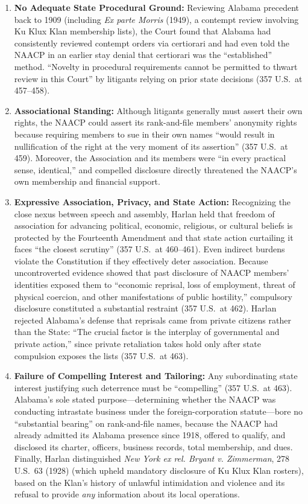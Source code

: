 \documentclass[12pt]{article}
\begin{document}
\begin{enumerate}
  \item \textbf{No Adequate State Procedural Ground:} Reviewing Alabama precedent back to 1909 (including \textit{Ex parte Morris} (1949), a contempt review involving Ku Klux Klan membership lists), the Court found that Alabama had consistently reviewed contempt orders via certiorari and had even told the NAACP in an earlier stay denial that certiorari was the ``established'' method. ``Novelty in procedural requirements cannot be permitted to thwart review in this Court'' by litigants relying on prior state decisions (357 U.S.\ at 457--458).

  \item \textbf{Associational Standing:} Although litigants generally must assert their own rights, the NAACP could assert its rank-and-file members' anonymity rights because requiring members to sue in their own names ``would result in nullification of the right at the very moment of its assertion'' (357 U.S.\ at 459). Moreover, the Association and its members were ``in every practical sense, identical,'' and compelled disclosure directly threatened the NAACP's own membership and financial support.

  \item \textbf{Expressive Association, Privacy, and State Action:} Recognizing the close nexus between speech and assembly, Harlan held that freedom of association for advancing political, economic, religious, or cultural beliefs is protected by the Fourteenth Amendment and that state action curtailing it faces ``the closest scrutiny'' (357 U.S.\ at 460--461). Even indirect burdens violate the Constitution if they effectively deter association. Because uncontroverted evidence showed that past disclosure of NAACP members' identities exposed them to ``economic reprisal, loss of employment, threat of physical coercion, and other manifestations of public hostility,'' compulsory disclosure constituted a substantial restraint (357 U.S.\ at 462). Harlan rejected Alabama's defense that reprisals came from private citizens rather than the State: ``The crucial factor is the interplay of governmental and private action,'' since private retaliation takes hold only after state compulsion exposes the lists (357 U.S.\ at 463).

  \item \textbf{Failure of Compelling Interest and Tailoring:} Any subordinating state interest justifying such deterrence must be ``compelling'' (357 U.S.\ at 463). Alabama's sole stated purpose---determining whether the NAACP was conducting intrastate business under the foreign-corporation statute---bore no ``substantial bearing'' on rank-and-file names, because the NAACP had already admitted its Alabama presence since 1918, offered to qualify, and disclosed its charter, officers, business records, total membership, and dues. Finally, Harlan distinguished \textit{New York ex rel. Bryant v. Zimmerman}, 278 U.S.\ 63 (1928) (which upheld mandatory disclosure of Ku Klux Klan rosters), based on the Klan's history of unlawful intimidation and violence and its refusal to provide \textit{any} information about its local operations.
\end{enumerate}
\end{document}
